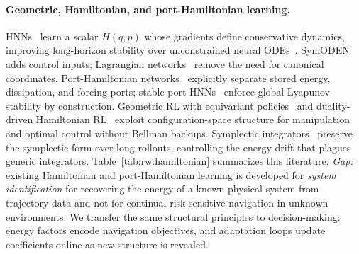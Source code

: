 \paragraph{Geometric, Hamiltonian, and port-Hamiltonian learning.}
HNNs~\citep{greydanus2019hamiltonian} learn a scalar $H(q,p)$ whose
gradients define conservative dynamics, improving long-horizon
stability over unconstrained neural ODEs~\citep{chen2019neuralordinarydifferentialequations}.
SymODEN~\citep{zhong2020symplectic} adds control inputs; Lagrangian
networks~\citep{cranmer2020lagrangian} remove the need for canonical
coordinates.
Port-Hamiltonian networks~\citep{dipersio2025porthamiltonianneuralnetworkstheory,desai2021porthamiltonian}
explicitly separate stored energy, dissipation, and forcing ports;
stable port-HNNs~\citep{roth2025stable} enforce global Lyapunov
stability by construction.
Geometric RL with equivariant
policies~\citep{hoang2025geometry,martínezrubio2023acceleratedriemannianoptimizationhandling} and
duality-driven Hamiltonian RL~\citep{nguyen2024dpo} exploit
configuration-space structure for manipulation and optimal control
without Bellman backups.
Symplectic integrators~\citep{reich1996symplectic,hairer2006geometric}
preserve the symplectic form over long rollouts, controlling the
energy drift that plagues generic integrators.
Table~\ref{tab:rw:hamiltonian} summarizes this literature.
\emph{Gap:} existing Hamiltonian and port-Hamiltonian learning is
developed for \emph{system identification} for recovering the energy of a
known physical system from trajectory data and not for continual
risk-sensitive navigation in unknown environments.
We transfer the same structural principles to decision-making:
energy factors encode navigation objectives, and adaptation loops
update coefficients online as new structure is revealed.

